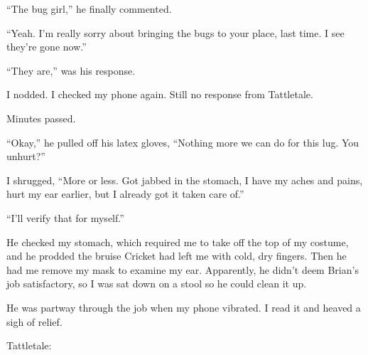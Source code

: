 ``The bug girl,'' he finally commented.



``Yeah.  I'm really sorry about bringing the bugs to your place, last time.  I see they're gone now.''



``They are,'' was his response.



I nodded.  I checked my phone again.  Still no response from Tattletale.



Minutes passed.



``Okay,'' he pulled off his latex gloves, ``Nothing more we can do for this lug.  You unhurt?''



I shrugged, ``More or less.  Got jabbed in the stomach, I have my aches and pains, hurt my ear earlier, but I already got it taken care of.''



``I'll verify that for myself.''



He checked my stomach, which required me to take off the top of my costume, and he prodded the bruise Cricket had left me with cold, dry fingers.  Then he had me remove my mask to examine my ear.  Apparently, he didn't deem Brian's job satisfactory, so I was sat down on a stool so he could clean it up.



He was partway through the job when my phone vibrated.  I read it and heaved a sigh of relief.



Tattletale:



